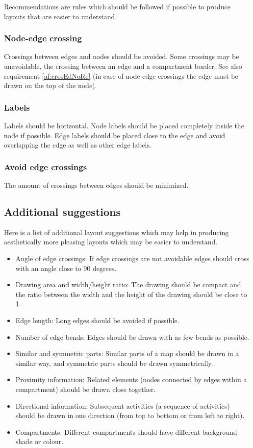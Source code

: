 Recommendations are rules which should be followed if possible to produce layouts that are easier to understand.

\subsubsection{Node-edge crossing}
\label{af:crosEdNo}

Crossings between edges and nodes should be avoided. Some crossings may be unavoidable, \eg the crossing between an edge and a compartment border. See also requirement \ref{af:crosEdNoRe} (in case of node-edge crossings the edge must be drawn on the top of the node).

\subsubsection{Labels}

Labels should be horizontal. Node labels should be placed completely inside the node if possible. Edge labels should be placed close to the edge and avoid overlapping the edge as well as other edge labels.

\subsubsection{Avoid edge crossings}

The amount of crossings between edges should be minimized.

\subsection{Additional suggestions}

Here is a list of additional layout suggestions which may help in producing aesthetically more pleasing layouts which may be easier to understand.

\begin{itemize}
  \item Angle of edge crossings: If edge crossings are not avoidable   edges should cross with an angle close to 90 degrees.
  \item Drawing area and width/height ratio: The drawing should be compact and the ratio between the width and the height of the drawing should be close to 1.
  \item Edge length: Long edges should be avoided if possible.
  \item Number of edge bends: Edges should be drawn with as few bends as possible.
  \item Similar and symmetric parts: Similar parts of a map should be drawn in a similar way, and symmetric parts should be drawn symmetrically.
  \item Proximity information: Related elements (\eg nodes connected by edges within a compartment) should be drawn close together.
  \item Directional information: Subsequent activities (\eg a sequence of activities) should be drawn in one direction (\eg from top to bottom or from left to right).
  \item Compartments: Different compartments should have different background shade or colour.
\end{itemize}